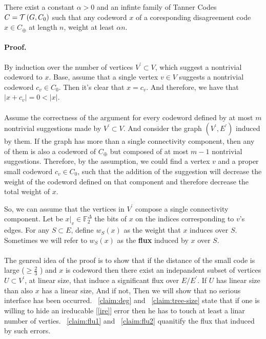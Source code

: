 \documentclass[manuscript,screen,review]{acmart}
\begin{document}
  \begin{theorem*}[Theorem 1] There exist a constant $\alpha > 0$ and an infinte family of Tanner Codes $C = \mathcal{T}\left( G, C_0 \right)$ such that any \ireducable codeword $x$ of a coresponding disagreement code $x \in C_{\oplus}$ at length $n$, weight at least $\alpha n$. \end{theorem*}


  \paragraph{Proof.} By induction over the number of vertices $V^\prime \subset V$, which suggest a nontrivial codeword to $x$. Base, assume that a single vertex $v \in V$ suggests a nontrivial codeword $c_{v} \in C_{0}$. Then it's clear that $x = c_{v}$. And therefore, we have that $|x +c_{v}| = 0 < |x|$.

  \paragraph{}

  Assume the correctness of the argument for every codeword defined by at most $m$ nontrivial suggestions made by $V^\prime \subset V$. And consider the graph $\left( V^\prime, E^\prime \right)$ induced by them. If the graph has more than a single connectivity component, then any of them is also a codeword of $C_{\oplus}$  but composed of at most $m-1$ nontrivial suggestions. Therefore, by the assumption, we could find a vertex $v$ and a proper small codeword $c_v \in C_0 $, such that the addition of the suggestion will decrease the weight of the codeword defined on that component and therefore decrease the total weight of $x$.

  So, we can assume that the vertices in $V^\prime$ compose a single connectivity component. Let be $x|_{v} \in \mathbb{F}_{2}^{\Delta}$ the bits of $x$ on the indices corresponding to $v$'s edges. For any $S \subset E$, define $w_{S}\left( x \right)$ as the weight that $x$ induces over $S$. Sometimes we will refer to $w_{S}\left( x \right)$ as the \textbf{flux} induced by $x$ over $S$.

  \paragraph{}

  The genreal idea of the proof is to show that if the distance of the small code is large ($ \ge \frac{2}{3}$ ) and $x$ is \ireducable codeword then there exist an indepandent subset of vertices $U \subset V^{\prime}$, at linear size, that induce a significant flux over $E/E^{\prime}$. If $U$ has linear size than also $x$ has a linear size, And if not, Then we will show that no serious interface has been occurred. ~\cref{claim:deg} and ~\cref{claim:tree-size} state that if one is willing to hide an ireducable \hyperref[ire]{[\ref{ire}]} error then he has to touch at least a linar number of verties. ~\cref{claim:flu1} and  ~\cref{claim:flu2} quanitify the flux that induced by such errors. 
\end{document}
